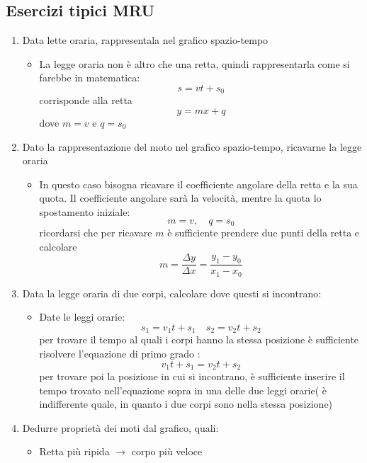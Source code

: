 \subsection{Esercizi tipici MRU}
\begin{enumerate}
	\item Data lette oraria, rappresentala nel grafico spazio-tempo
	      \begin{itemize}
		      \item La legge oraria non è altro che una retta, quindi rappresentarla come si farebbe in matematica:
		            \[
			            s = v t + s_0
		            \]
		            corrisponde alla retta
		            \[
			            y = mx + q
		            \]
		            dove $ m = v $ e $ q = s_0 $
	      \end{itemize}
	\item Dato la rappresentazione del moto nel grafico spazio-tempo, ricavarne la legge oraria
	      \begin{itemize}
		      \item In questo caso bisogna ricavare il coefficiente angolare della retta e la sua quota. Il coefficiente angolare sarà la velocità, mentre la quota lo spostamento iniziale:
		            \[
			            m = v, \quad q = s_0
		            \]
		            ricordarsi che per ricavare $ m $ è sufficiente prendere due punti della retta e calcolare
		            \[
			            m = \frac{\Delta y}{\Delta x}  = \frac{y_1 - y_0}{x_1- x_0}
		            \]
	      \end{itemize}
	\item Data la legge oraria di due corpi, calcolare dove questi si incontrano:
	      \begin{itemize}
		      \item Date le leggi orarie:
		            \[
			            s_1 = v_1t + s_1  \quad  s_2 = v_2t + s_2
		            \]
		            per trovare il tempo al quali i corpi hanno la stessa posizione è sufficiente risolvere l'equazione di primo grado :
		            \[
			            v_1t + s_1 = v_2t + s_2
		            \]
		            per trovare poi la posizione in cui si incontrano, è sufficiente inserire il tempo trovato nell'equazione sopra in una delle due leggi orarie( è indifferente quale, in quanto i due corpi sono nella stessa posizione)
	      \end{itemize}
	\item Dedurre proprietà dei moti dal grafico, quali:
	      \begin{itemize}
		      \item Retta più ripida $ \rightarrow $ corpo più veloce

\end{itemize}
\end{enumerate}

